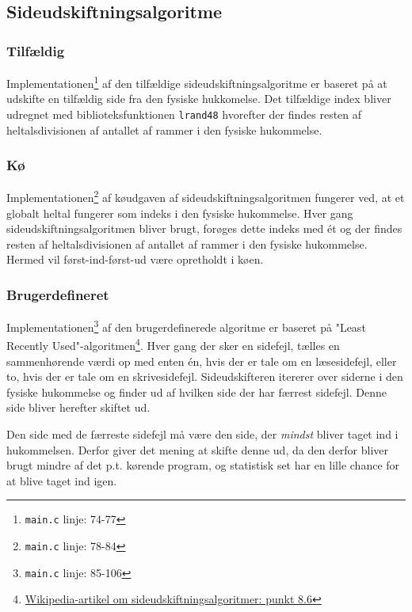 \subsection{Sideudskiftningsalgoritme}
\label{pagereplacementalgorithms}
\subsubsection{Tilfældig}
Implementationen\footnote{\texttt{main.c} linje: 74-77} af den tilfældige sideudskiftningsalgoritme er baseret på at udskifte en tilfældig side fra den fysiske hukkomelse. Det tilfældige index bliver udregnet med biblioteksfunktionen \texttt{lrand48} hvorefter der findes resten af heltalsdivisionen af antallet af rammer i den fysiske hukommelse.

\subsubsection{Kø}
Implementationen\footnote{\texttt{main.c} linje: 78-84} af køudgaven af sideudskiftningsalgoritmen fungerer ved, at et globalt heltal fungerer som indeks i den fysiske hukommelse. Hver gang sideudskiftningsalgoritmen bliver brugt, forøges dette indeks med ét og der findes resten af heltalsdivisionen af antallet af rammer i den fysiske hukommelse. Hermed vil først-ind-først-ud være opretholdt i køen.

\subsubsection{Brugerdefineret}
Implementationen\footnote{\texttt{main.c} linje: 85-106} af den brugerdefinerede algoritme er baseret på "Least Recently Used"-algoritmen\footnote{\href{https://en.wikipedia.org/wiki/Page_replacement_algorithm}{Wikipedia-artikel om sideudskiftningsalgoritmer: punkt 8.6}}. Hver gang der sker en sidefejl, tælles en sammenhørende værdi op med enten én, hvis der er tale om en læsesidefejl, eller to, hvis der er tale om en skrivesidefejl. Sideudskifteren itererer over siderne i den fysiske hukommelse og finder ud af hvilken side der har færrest sidefejl. Denne side bliver herefter skiftet ud. 

Den side med de færreste sidefejl må være den side, der \textit{mindst} bliver taget ind i hukommelsen. Derfor giver det mening at skifte denne ud, da den derfor bliver brugt mindre af det p.t. kørende program, og statistisk set har en lille chance for at blive taget ind igen.
